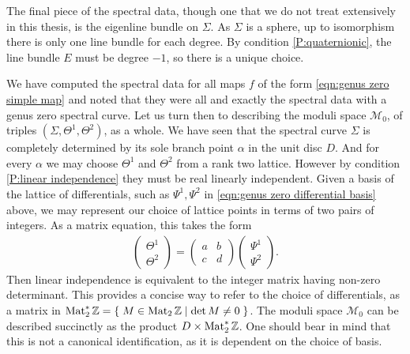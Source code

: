 The final piece of the spectral data, though one that we do not treat extensively in this thesis, is the eigenline bundle on $Σ$. As $Σ$ is a sphere, up to isomorphism there is only one line bundle for each degree. By condition \ref{P:quaternionic}, the line bundle $E$ must be degree $-1$, so there is a unique choice.





We have computed the spectral data for all maps $f$ of the form \eqref{eqn:genus zero simple map} and noted that they were all and exactly the spectral data with a genus zero spectral curve. Let us turn then to describing the moduli space $\mathcal{M}_0$, of triples $(Σ,Θ^1,Θ^2)$, as a whole. We have seen that the spectral curve $Σ$ is completely determined by its sole branch point $α$ in the unit disc $D$. And for every $α$ we may choose $Θ^1$ and $Θ^2$ from a rank two lattice. However by condition \ref{P:linear independence} they must be real linearly independent. Given a basis of the lattice of differentials, such as $Ψ^1, Ψ^2$ in \eqref{eqn:genus zero differential basis} above, we may represent our choice of lattice points in terms of two pairs of integers. As a matrix equation, this takes the form
\begin{align*}
\begin{pmatrix}
Θ^1 \\ Θ^2
\end{pmatrix}
=
\begin{pmatrix}
a & b \\
c & d
\end{pmatrix}
\begin{pmatrix}
Ψ^1 \\ Ψ^2
\end{pmatrix}.
\end{align*}
Then linear independence is equivalent to the integer matrix having non-zero determinant. This provides a concise way to refer to the choice of differentials, as a matrix in $\Mat_2^*\Z = \Set{ M \in \Mat_2\Z }{\det M \neq 0}$. The moduli space $\mathcal{M}_0$ can be described succinctly as the product $D \times \Mat_2^*\Z$. One should bear in mind that this is not a canonical identification, as it is dependent on the choice of basis.

